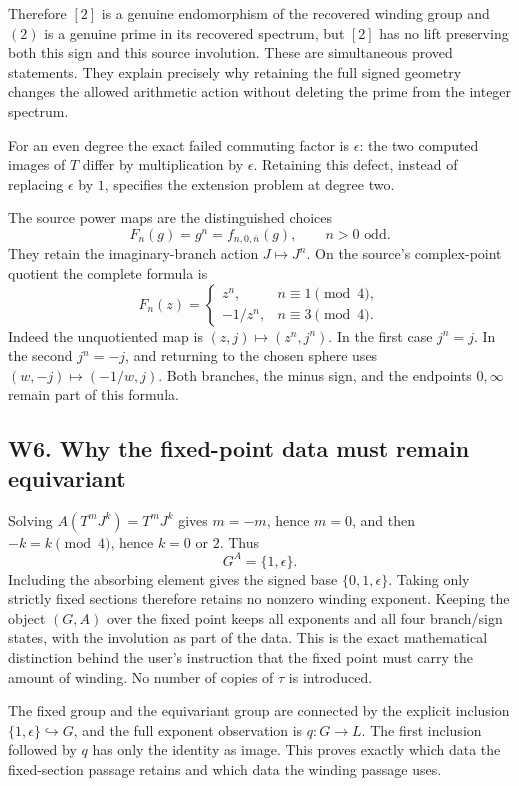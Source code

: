 \documentclass[
  11pt,
]{article}
\begin{document}
Therefore \([2]\) is a genuine endomorphism of the recovered winding
group and \((2)\) is a genuine prime in its recovered spectrum, but
\([2]\) has no lift preserving both this sign and this source
involution. These are simultaneous proved statements. They explain
precisely why retaining the full signed geometry changes the allowed
arithmetic action without deleting the prime from the integer spectrum.

For an even degree the exact failed commuting factor is \(\epsilon\):
the two computed images of \(T\) differ by multiplication by
\(\epsilon\). Retaining this defect, instead of replacing \(\epsilon\)
by \(1\), specifies the extension problem at degree two.

The source power maps are the distinguished choices \[
F_n(g)=g^n=f_{n,0,\bar n}(g),\qquad n>0\text{ odd}.
\] They retain the imaginary-branch action \(J\mapsto J^n\). On the
source's complex-point quotient the complete formula is \[
F_n(z)=
\begin{cases}
z^n,&n\equiv1\pmod4,\\
-1/z^n,&n\equiv3\pmod4.
\end{cases}
\] Indeed the unquotiented map is \((z,j)\mapsto(z^n,j^n)\). In the
first case \(j^n=j\). In the second \(j^n=-j\), and returning to the
chosen sphere uses \((w,-j)\mapsto(-1/w,j)\). Both branches, the minus
sign, and the endpoints \(0,\infty\) remain part of this formula.

\subsection{W6. Why the fixed-point data must remain
equivariant}\label{w6.-why-the-fixed-point-data-must-remain-equivariant}

Solving \(A(T^mJ^k)=T^mJ^k\) gives \(m=-m\), hence \(m=0\), and then
\(-k=k\pmod4\), hence \(k=0\) or \(2\). Thus \[
G^A=\{1,\epsilon\}.
\] Including the absorbing element gives the signed base
\(\{0,1,\epsilon\}\). Taking only strictly fixed sections therefore
retains no nonzero winding exponent. Keeping the object \((G,A)\) over
the fixed point keeps all exponents and all four branch/sign states,
with the involution as part of the data. This is the exact mathematical
distinction behind the user's instruction that the fixed point must
carry the amount of winding. No number of copies of \(\tau\) is
introduced.

The fixed group and the equivariant group are connected by the explicit
inclusion \(\{1,\epsilon\}\hookrightarrow G\), and the full exponent
observation is \(q:G\to L\). The first inclusion followed by \(q\) has
only the identity as image. This proves exactly which data the
fixed-section passage retains and which data the winding passage uses.
\end{document}
